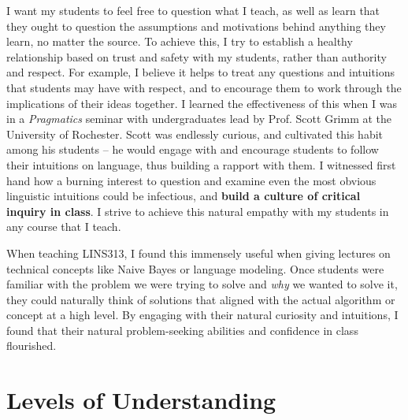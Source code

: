 \documentclass[11pt, letterpaper]{practical-report}
\begin{document}
I want my students to feel free to question what I teach, as well as learn that they ought to question the assumptions and motivations behind anything they learn, no matter the source. To achieve this, I try to establish a healthy relationship based on trust and safety with my students, rather than authority and respect. For example, I believe it helps to treat any questions and intuitions that students may have with respect, and to encourage them to work through the implications of their ideas together. I learned the effectiveness of this when I was in a \textit{Pragmatics} seminar with undergraduates lead by Prof. Scott Grimm at the University of Rochester. Scott was endlessly curious, and cultivated this habit among his students -- he would engage with and encourage students to follow their intuitions on language, thus building a rapport with them. I witnessed first hand how a burning interest to question and examine even the most obvious linguistic intuitions could be infectious, and \textbf{build a culture of critical inquiry in class}. I strive to achieve this natural empathy with my students in any course that I teach. 

When teaching {\rmcs LINS313}, I found this immensely useful when giving lectures on technical concepts like Naive Bayes or language modeling. Once students were familiar with the problem we were trying to solve and \emph{why} we wanted to solve it, they could naturally think of solutions that aligned with the actual algorithm or concept at a high level. By engaging with their natural curiosity and intuitions, I found that their natural problem-seeking abilities and confidence in class flourished.

\section*{Levels of Understanding}
\end{document}

